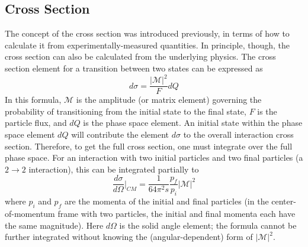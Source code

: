 



\subsection{\Zee Cross Section}
\label{theory:xsec}




The concept of the cross section was introduced previously, 
in terms of how to calculate it from experimentally-measured 
quantities.  
In principle, though, the cross section 
can also be calculated from the underlying physics.  
The cross section element for a transition 
between two states can be expressed as 
\[
d \sigma = \frac{ \left| \mathcal{M} \right| ^2 }{F} d Q
\]
In this formula, $\mathcal{M}$ is the amplitude 
(or matrix element) governing the probability of 
transitioning from the initial state to the final state, 
$F$ is the particle flux, and $d Q$ is the 
phase space element.  
An initial state within the phase space element $d Q$ will 
contribute the element $d \sigma$ to the overall 
interaction cross section.  
Therefore, to get the full cross section, one must integrate 
over the full phase space.  
For an interaction with two initial particles and 
two final particles 
(a $2 \rightarrow 2$ interaction), 
this can be integrated partially to 
\[
\frac{d \sigma}{d \Omega} \bigg| _{CM} 
= \frac{1}{64 \pi^2 s} \frac{p_f}{p_i} \left| \mathcal{M} \right| ^2
\]
where $p_i$ and $p_f$ are the momenta of the initial and final particles 
(in the center-of-momentum frame with two particles, 
the initial and final momenta each have the same magnitude).  
Here $d \Omega$ is the solid angle element; 
the formula cannot be further integrated without knowing the 
(angular-dependent) form of $ \left| \mathcal{M} \right| ^2 $.  


